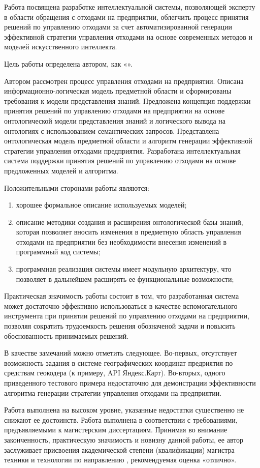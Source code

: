 \documentclass[a4paper]{G2-105}
\begin{document}
\VSTUInitializeReview

Работа посвящена разработке интеллектуальной системы, позволяющей эксперту в области обращения с отходами на предприятии, облегчить процесс принятия решений по управлению отходами за счет автоматизированной генерации эффективной стратегии управления отходами на основе современных методов и моделей искусственного интеллекта.

Цель работы определена автором, как «\CommonGoal».

Автором рассмотрен процесс управления отходами на предприятии. Описана информационно-логическая модель предметной области и сформированы требования к модели представления знаний. Предложена концепция поддержки принятия решений по управлению отходами на предприятии на основе онтологической модели представления знаний и логического вывода на онтологиях с использованием семантических запросов. Представлена онтологическая модель предметной области и алгоритм генерации эффективной стратегии управления отходами предприятия. Разработана  интеллектуальная система поддержки принятия решений по управлению отходами на основе предложенных моделей и алгоритма.

Положительными сторонами работы являются:
\begin{enumerate}
\item хорошее формальное описание используемых моделей;
\item описание методики создания и расширения онтологической базы знаний, которая позволяет вносить изменения в предметную область управления отходами на предприятии без необходимости внесения изменений в программный код системы;
\item программная реализация системы имеет модульную архитектуру, что позволяет в дальнейшем расширять ее функциональные возможности;
\end{enumerate}

Практическая значимость работы состоит в том, что разработанная система может достаточно эффективно использоваться в качестве вспомогательного инструмента при принятии решений по управлению отходами на предприятии, позволяя сократить трудоемкость решения обозначеной задачи и повысить обоснованность принимаемых решений.

В качестве замечаний можно отметить следующее. Во-первых, отсутствует возможность задания в системе географических координат предриятия по средствам геокодера (к примеру, API Яндекс.Карт). Во-вторых, одного приведенного тестового примера недостаточно для демонстрации эффективности алгоритма генерации стратегии управления отходами на предприятии.

Работа \VSTUStudentFullNameGenitive{} выполнена на высоком уровне, указанные недостатки существенно не снижают ее достоинств. Работа выполнена в соответствии с требованиями, предъявляемыми к магистерским диссертациям. Принимая во внимание законченность, практическую значимость и новизну данной работы, ее автор \VSTUStudentName{} заслуживает присвоения академической степени (квалификации) магистра техники и технологии по направлению \VSTUDirection{}, рекомендуемая оценка «отлично».

\vspace{10mm}
\VSTUFinishReview
\end{document}
